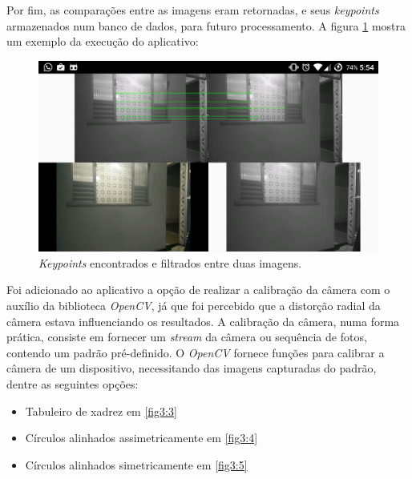 Por fim, as comparações entre as imagens eram retornadas, e seus \textit{keypoints} armazenados num banco de dados, para futuro processamento. A figura \ref{fig3:2} mostra um exemplo da execução do aplicativo:

\begin{figure}[H]
	\centering
		\includegraphics[width= \textwidth]{Imagens/figura3-2E4-4.png}
	\caption{\textit{Keypoints} encontrados e filtrados entre duas imagens.}
	\label{fig3:2}
\end{figure}

 
Foi adicionado ao aplicativo a opção de realizar a calibração da câmera com o auxílio da biblioteca \textit{OpenCV}, já que foi percebido que a distorção radial da câmera estava influenciando os resultados. A calibração da câmera, numa forma prática, consiste em fornecer um \textit{stream} da câmera ou sequência de fotos, contendo um padrão pré-definido. O \textit{OpenCV} fornece funções para calibrar a câmera de um dispositivo, necessitando das imagens capturadas do padrão, dentre as seguintes opções:

\begin{itemize}
	\item{Tabuleiro de xadrez em \ref{fig3:3}}
	\item{Círculos alinhados assimetricamente em \ref{fig3:4}}
	\item{Círculos alinhados simetricamente em \ref{fig3:5}}
\end{itemize}

